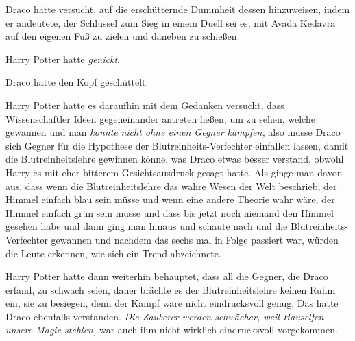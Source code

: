 Draco hatte versucht, auf die erschütternde Dummheit dessen hinzuweisen, indem er andeutete, der Schlüssel zum Sieg in einem Duell sei es, mit Avada Kedavra auf den eigenen Fuß zu zielen und daneben zu schießen.

Harry Potter hatte \emph{genickt}.

Draco hatte den Kopf geschüttelt.

Harry Potter hatte es daraufhin mit dem Gedanken versucht, dass Wissenschaftler Ideen gegeneinander antreten ließen, um zu sehen, welche gewannen und man \emph{konnte} \emph{nicht ohne einen Gegner kämpfen,} also müsse Draco sich Gegner für die Hypothese der Blutreinheits-Verfechter einfallen lassen, damit die Blutreinheitslehre gewinnen könne, was Draco etwas besser verstand, obwohl Harry es mit eher bitterem Gesichtsausdruck gesagt hatte. Als ginge man davon aus, dass wenn die Blutreinheitslehre das wahre Wesen der Welt beschrieb, der Himmel einfach blau sein müsse und wenn eine andere Theorie wahr wäre, der Himmel einfach grün sein müsse und dass bis jetzt noch niemand den Himmel gesehen habe und dann ging man hinaus und schaute nach und die Blutreinheits-Verfechter gewannen und nachdem das sechs mal in Folge passiert war, würden die Leute erkennen, wie sich ein Trend abzeichnete.

Harry Potter hatte dann weiterhin behauptet, dass all die Gegner, die Draco erfand, zu schwach seien, daher brächte es der Blutreinheitslehre keinen Ruhm ein, sie zu besiegen, denn der Kampf wäre nicht eindrucksvoll genug. Das hatte Draco ebenfalls verstanden. \emph{Die Zauberer werden schwächer, weil Hauselfen unsere Magie stehlen,} war auch ihm nicht wirklich eindrucksvoll vorgekommen.

